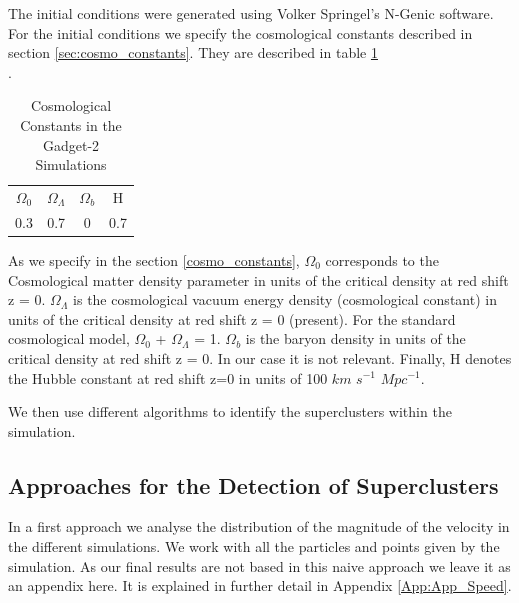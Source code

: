 \documentclass[12pt]{article}
\begin{document}
The initial conditions were generated using Volker
 Springel's N-Genic software. For the initial
  conditions we specify the cosmological constants
   described in section \ref{sec:cosmo_constants}. They
    are described in table \ref{tab:consts}\\.
   
  
 \begin{table}[ht]
    \centering
    \begin{tabular}{|c|c|c|c|}
        $\Omega_0$ & $\Omega_{\Lambda}$ & $\Omega_b$ & H \\
        0.3 &  0.7 & 0 & 0.7 \\
    \end{tabular}
    \caption{Cosmological Constants in the Gadget-2 Simulations}
    \label{tab:consts}
\end{table}
\FloatBarrier

As we specify in the section \ref{cosmo_constants}, $\Omega_0$  corresponds to the Cosmological matter
 density parameter in units of the critical density at
red shift z = 0. $\Omega_{\Lambda}$ is the cosmological
 vacuum energy density (cosmological constant) in
  units of the critical density at red shift z = 0 (present). 
For the standard cosmological model, $\Omega_0$ + $\Omega_{\Lambda}$ = 1.
 $\Omega_b$ is the baryon density in units
  of the critical density at red shift z = 0. In our
   case it
   is not relevant. Finally, H denotes the Hubble
    constant at red shift z=0 in  units of 100 
    $km$ $s^{-1}$
     $Mpc^{-1}$. 

We then use different algorithms to identify the
 superclusters within the simulation.\\

\subsection{Approaches for the Detection of Superclusters} \label{sec:approaches}
\begin{par}
In a first approach we analyse the distribution of
 the magnitude of the velocity in the different
  simulations. We work with all the particles and
   points given by the simulation. As our final
    results are not based in this naive approach
     we leave it as an appendix here. It is
      explained in further detail in Appendix
       \ref{App:App_Speed}.\\
\end{par}
\end{document}
